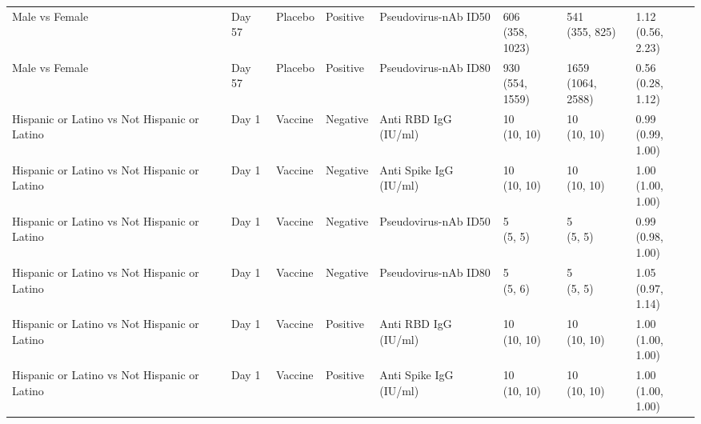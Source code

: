 \documentclass[]{book}
\theoremstyle{definition}
\theoremstyle{definition}
\theoremstyle{definition}
\newcommand{\1}{\mathbbm{1}}
\begin{document}
\begin{landscape}
\begin{ThreePartTable}
\begin{longtable}[t]{>{\raggedright\arraybackslash}p{2.7cm}lllllll}
Male vs Female & Day 57 & Placebo & Positive & Pseudovirus-nAb ID50 & \makecell[l]{606\\(358, 1023)} & \makecell[l]{541\\(355, 825)} & \makecell[l]{1.12\\(0.56, 2.23)}\\
Male vs Female & Day 57 & Placebo & Positive & Pseudovirus-nAb ID80 & \makecell[l]{930\\(554, 1559)} & \makecell[l]{1659\\(1064, 2588)} & \makecell[l]{0.56\\(0.28, 1.12)}\\
\addlinespace
Hispanic or Latino vs Not Hispanic or Latino & Day 1 & Vaccine & Negative & Anti RBD IgG (IU/ml) & \makecell[l]{10\\(10, 10)} & \makecell[l]{10\\(10, 10)} & \makecell[l]{0.99\\(0.99, 1.00)}\\
Hispanic or Latino vs Not Hispanic or Latino & Day 1 & Vaccine & Negative & Anti Spike IgG (IU/ml) & \makecell[l]{10\\(10, 10)} & \makecell[l]{10\\(10, 10)} & \makecell[l]{1.00\\(1.00, 1.00)}\\
Hispanic or Latino vs Not Hispanic or Latino & Day 1 & Vaccine & Negative & Pseudovirus-nAb ID50 & \makecell[l]{5\\(5, 5)} & \makecell[l]{5\\(5, 5)} & \makecell[l]{0.99\\(0.98, 1.00)}\\
Hispanic or Latino vs Not Hispanic or Latino & Day 1 & Vaccine & Negative & Pseudovirus-nAb ID80 & \makecell[l]{5\\(5, 6)} & \makecell[l]{5\\(5, 5)} & \makecell[l]{1.05\\(0.97, 1.14)}\\
Hispanic or Latino vs Not Hispanic or Latino & Day 1 & Vaccine & Positive & Anti RBD IgG (IU/ml) & \makecell[l]{10\\(10, 10)} & \makecell[l]{10\\(10, 10)} & \makecell[l]{1.00\\(1.00, 1.00)}\\
\addlinespace
Hispanic or Latino vs Not Hispanic or Latino & Day 1 & Vaccine & Positive & Anti Spike IgG (IU/ml) & \makecell[l]{10\\(10, 10)} & \makecell[l]{10\\(10, 10)} & \makecell[l]{1.00\\(1.00, 1.00)}\\

\end{longtable}
\end{ThreePartTable}
\end{landscape}
\end{document}
